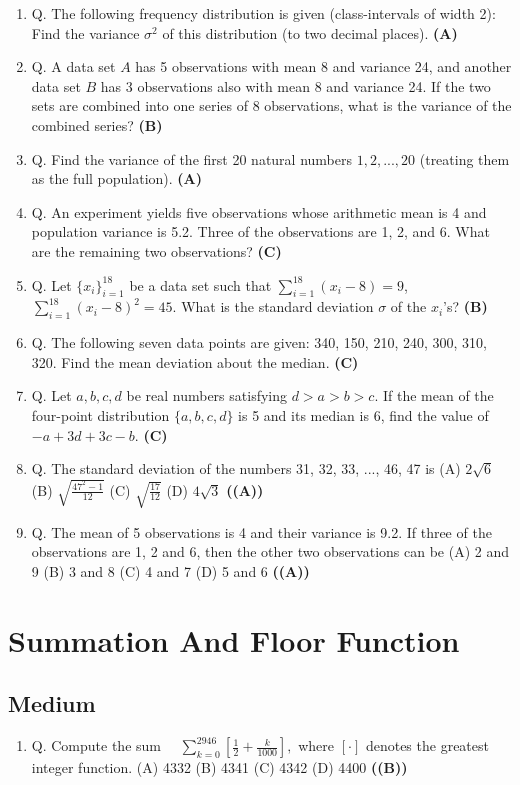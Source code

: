 \documentclass{article}
\begin{document}
\begin{enumerate}
\item Q. The following frequency distribution is given (class-intervals of width 2): Find the variance $\sigma^2$ of this distribution (to two decimal places). \hfill \textbf{(A)}
\item Q. A data set $A$ has 5 observations with mean 8 and variance 24, and another data set $B$ has 3 observations also with mean 8 and variance 24. If the two sets are combined into one series of 8 observations, what is the variance of the combined series? \hfill \textbf{(B)}
\item Q. Find the variance of the first 20 natural numbers $1,2,...,20$ (treating them as the full population). \hfill \textbf{(A)}
\item Q. An experiment yields five observations whose arithmetic mean is 4 and population variance is 5.2. Three of the observations are 1, 2, and 6. What are the remaining two observations? \hfill \textbf{(C)}
\item Q. Let $\{x_i\}_{i=1}^{18}$ be a data set such that $\sum_{i=1}^{18}(x_i - 8) = 9$, $\sum_{i=1}^{18}(x_i - 8)^2 = 45$. What is the standard deviation $\sigma$ of the $x_i$'s? \hfill \textbf{(B)}
\item Q. The following seven data points are given: 340, 150, 210, 240, 300, 310, 320. Find the mean deviation about the median. \hfill \textbf{(C)}
\item Q. Let $a, b, c, d$ be real numbers satisfying $d > a > b > c$. If the mean of the four-point distribution $\{a, b, c, d\}$ is 5 and its median is 6, find the value of $-a + 3d + 3c - b$. \hfill \textbf{(C)}
\item Q. The standard deviation of the numbers 31, 32, 33, ..., 46, 47 is
(A) $2\sqrt{6}$
(B) $\sqrt{\frac{47^2-1}{12}}$
(C) $\sqrt{\frac{17}{12}}$
(D) $4\sqrt{3}$ \hfill \textbf{((A))}
\item Q. The mean of 5 observations is 4 and their variance is 9.2. If three of the observations are 1, 2 and 6, then the other two observations can be
(A) 2 and 9
(B) 3 and 8
(C) 4 and 7
(D) 5 and 6 \hfill \textbf{((A))}
\end{enumerate}
\section{Summation And Floor Function}
\subsection{Medium}
\begin{enumerate}
\item Q. Compute the sum
$\quad \sum_{k=0}^{2946} [\frac{1}{2} + \frac{k}{1000}],$
where $[\cdot]$ denotes the greatest integer function.
(A) 4332
(B) 4341
(C) 4342
(D) 4400 \hfill \textbf{((B))}
\end{enumerate}
\end{document}
